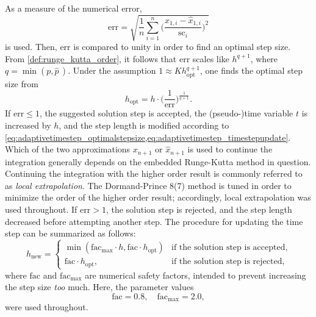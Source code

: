 As a measure of the numerical error,
\begin{equation}
    \label{eq:adaptivetimestep_errorestimate}
    \mathrm{err} = \sqrt{\frac{1}{n}\sum\limits_{i=1}^{n}\bigg(\frac{x_{1,i}-\widehat{x}_{1,i}}{\mathrm{sc}_{i}}\bigg)^{2}}
\end{equation}
is used. Then, $\mathrm{err}$ is compared to unity in order to find an optimal
step size. From \cref{def:runge_kutta_order}, it follows that $\mathrm{err}$
scales like $h^{q+1}$, where $q = \min(p,\widehat{p}\,)$. Under the assumption
$1\approx{}Kh_{\mathrm{opt}}^{q+1}$, one finds the optimal step size from
\begin{equation}
    \label{eq:adaptivetimestep_optimalstepsize}
    h_{\mathrm{opt}} = h\cdot\bigg(\frac{1}{\mathrm{err}}\bigg)^{\frac{1}{q+1}}.
\end{equation}
If $\mathrm{err}\leq1$, the suggested solution step is accepted, the
(pseudo-)time variable $t$ is increased by $h$, and the step length is modified
according to
\cref{eq:adaptivetimestep_optimalstepsize,eq:adaptivetimestep_timestepupdate}.
Which of the two approximations $x_{n+1}$ or $\widehat{x}_{n+1}$ is used to
continue the integration generally depends on the embedded Runge-Kutta method
in question. Continuing the integration with the higher order result is
commonly referred to as \emph{local extrapolation}. The Dormand-Prince 8(7)
method is tuned in order to minimize the order of the higher order result;
accordingly, local extrapolation was used throughout. If $\mathrm{err} > 1$, the
solution step is rejected, and the step length decreased before attempting
another step. The procedure for updating the time step can be summarized
as follows:
\begin{equation}
    \label{eq:adaptivetimestep_timestepupdate}
    h_{\mathrm{new}} = %
    \begin{cases}
        \min(\mathrm{fac}_{\mathrm{max}}\cdot{}h,\mathrm{fac}\cdot{}h_{\mathrm{opt}}) & \text{if the solution step is accepted,}\\
        \mathrm{fac}\cdot{}h_{\mathrm{opt}}, & \text{if the solution step is rejected,}
    \end{cases}
\end{equation}
where $\mathrm{fac}$ and $\mathrm{fac}_{\mathrm{max}}$ are numerical safety
factors, intended to prevent increasing the step size \emph{too} much. Here,
the parameter values
\begin{equation}
    \label{eq:adaptivetimetep_safetyfactors}
    \mathrm{fac}=0.8,\quad \mathrm{fac}_{\mathrm{max}} = 2.0,
\end{equation}
were used throughout.
